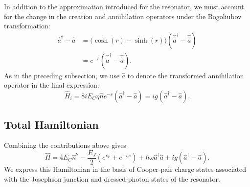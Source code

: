\documentclass[11pt,a4paper]{article}
\numberwithin{equation}{section}
\begin{document}
In addition to the approximation introduced for the resonator, we must
account for the change in the creation and annihilation operators under
the Bogoliubov transformation:
\begin{equation}
  \begin{aligned}
    \hat a^\dagger-\hat a
      &=\bigl(\cosh(r)-\sinh(r)\bigr) (\hat{\tilde a}^\dagger-\hat{\tilde a})\\
      &=e^{-r}(\hat{\tilde a}^\dagger-\hat{\tilde a}).
  \end{aligned}
\end{equation}
As in the preceding subsection, we use $\hat a$ to denote the
transformed annihilation operator in the final expression:
\begin{equation}
  \hat H_i
  =8iE_C\eta\hat n e^{-r}(\hat a^\dagger-\hat a)
  =ig(\hat a^\dagger-\hat a).
\end{equation}

\subsection{Total Hamiltonian}

Combining the contributions above gives
\begin{equation}
    \hat H
      =4E_C\hat n^2 -\frac{E_J}{2}(e^{i\varphi}+e^{-i\varphi})+\hbar\omega\hat a^\dagger\hat a+ig(\hat a^\dagger-\hat a).
\end{equation}
We express this Hamiltonian in the basis of Cooper-pair charge states
associated with the Josephson junction and dressed-photon states of the
resonator.

\newpage



\end{document}
